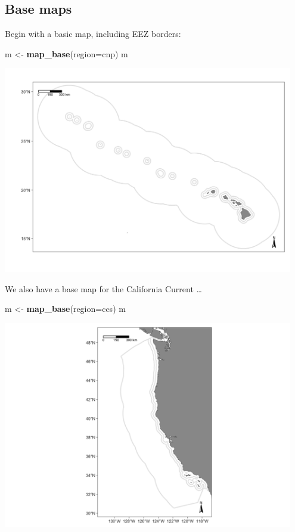 \documentclass[
]{book}
\newenvironment{Shaded}{\begin{snugshade}}{\end{snugshade}}
\newcommand{\AttributeTok}[1]{\textcolor[rgb]{0.13,0.29,0.53}{#1}}
\newcommand{\FunctionTok}[1]{\textcolor[rgb]{0.13,0.29,0.53}{\textbf{#1}}}
\newcommand{\NormalTok}[1]{#1}
\newcommand{\OtherTok}[1]{\textcolor[rgb]{0.56,0.35,0.01}{#1}}
\newcommand{\StringTok}[1]{\textcolor[rgb]{0.31,0.60,0.02}{#1}}
\begin{document}
\hypertarget{base-maps}{%
\subsection*{Base maps}\label{base-maps}}

Begin with a basic map, including EEZ borders:

\begin{Shaded}
\begin{Highlighting}[]
\NormalTok{m }\OtherTok{\textless{}{-}} \FunctionTok{map\_base}\NormalTok{(}\AttributeTok{region=}\StringTok{\textquotesingle{}cnp\textquotesingle{}}\NormalTok{)}
\NormalTok{m}
\end{Highlighting}
\end{Shaded}

\includegraphics[width=0.95\textwidth,height=\textheight]{img/map_cnp.png}

We also have a base map for the California Current \ldots{}

\begin{Shaded}
\begin{Highlighting}[]
\NormalTok{m }\OtherTok{\textless{}{-}} \FunctionTok{map\_base}\NormalTok{(}\AttributeTok{region=}\StringTok{\textquotesingle{}ccs\textquotesingle{}}\NormalTok{)}
\NormalTok{m}
\end{Highlighting}
\end{Shaded}

\includegraphics[width=0.95\textwidth,height=\textheight]{img/map_ccs.png}
\end{document}
